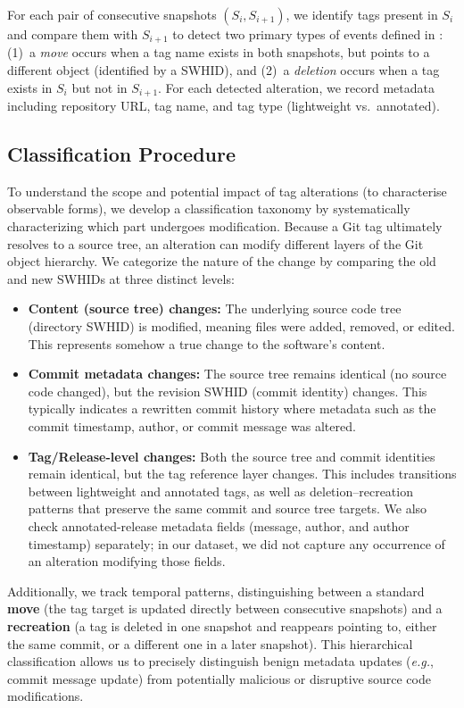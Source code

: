 For each pair of consecutive snapshots $(S_i, S_{i+1})$, we identify tags present in $S_i$ and compare them with $S_{i+1}$ to detect two primary types of events defined in : (1)~a \emph{move} occurs when a tag name exists in both snapshots, but points to a different object (identified by a SWHID), and (2)~a \emph{deletion} occurs when a tag exists in $S_i$ but not in $S_{i+1}$.
For each detected alteration, we record metadata including repository URL, tag name, and tag type (lightweight vs.~annotated).

\subsection{Classification Procedure}
\label{subsec:tags-classification}

To understand the scope and potential impact of tag alterations (to characterise observable forms), we develop a classification taxonomy by systematically characterizing which part undergoes modification.
Because a Git tag ultimately resolves to a source tree, an alteration can modify different layers of the Git object hierarchy.
We categorize the nature of the change by comparing the old and new SWHIDs at three distinct levels:
\begin{itemize}
\item \textbf{Content (source tree) changes:} The underlying source code tree (directory SWHID) is modified, meaning files were added, removed, or edited.
  This represents somehow a true change to the software's content.
\item \textbf{Commit metadata changes:} The source tree remains identical (no source code changed), but the revision SWHID (commit identity) changes.
  This typically indicates a rewritten commit history where metadata such as the commit timestamp, author, or commit message was altered.
\item \textbf{Tag/Release-level changes:} Both the source tree and commit identities remain identical, but the tag reference layer changes.
  This includes transitions between lightweight and annotated tags, as well as deletion--recreation patterns that preserve the same commit and source tree targets.
  We also check annotated-release metadata fields (message, author, and author timestamp) separately; in our dataset, we did not capture any occurrence of an alteration modifying those fields.
\end{itemize}
Additionally, we track temporal patterns, distinguishing between a standard \textbf{move} (the tag target is updated directly between consecutive snapshots) and a \textbf{recreation} (a tag is deleted in one snapshot and reappears pointing to, either the same commit, or a different one in a later snapshot).
This hierarchical classification allows us to precisely distinguish benign metadata updates (\emph{e.g.}, commit message update) from potentially malicious or disruptive source code modifications.

